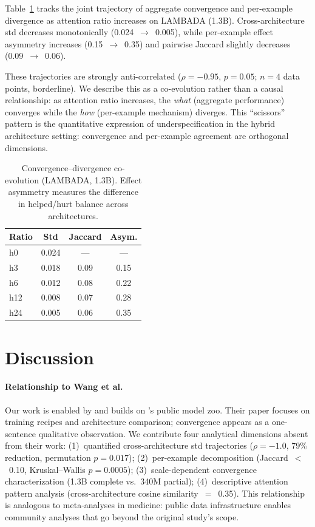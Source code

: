 \documentclass[11pt,twocolumn]{article}
\begin{document}
Table~\ref{tab:coevol} tracks the joint trajectory of aggregate convergence and per-example divergence as attention ratio increases on LAMBADA (1.3B).
Cross-architecture std decreases monotonically (0.024~$\to$~0.005), while per-example effect asymmetry increases (0.15~$\to$~0.35) and pairwise Jaccard slightly decreases (0.09~$\to$~0.06).

These trajectories are strongly anti-correlated ($\rho{=}{-}0.95$, $p{=}0.05$; $n{=}4$ data points, borderline).
We describe this as a co-evolution rather than a causal relationship: as attention ratio increases, the \emph{what} (aggregate performance) converges while the \emph{how} (per-example mechanism) diverges.
This ``scissors'' pattern is the quantitative expression of underspecification \citep{damour2022underspecification} in the hybrid architecture setting: convergence and per-example agreement are orthogonal dimensions.

\begin{table}[t]
\centering
\small
\caption{Convergence--divergence co-evolution (LAMBADA, 1.3B). Effect asymmetry measures the difference in helped/hurt balance across architectures.}\label{tab:coevol}
\begin{tabular}{@{}lccc@{}}
\toprule
\textbf{Ratio} & \textbf{Std} & \textbf{Jaccard} & \textbf{Asym.} \\
\midrule
h0 & 0.024 & --- & --- \\
h3 & 0.018 & 0.09 & 0.15 \\
h6 & 0.012 & 0.08 & 0.22 \\
h12 & 0.008 & 0.07 & 0.28 \\
h24 & 0.005 & 0.06 & 0.35 \\
\bottomrule
\end{tabular}
\end{table}


\section{Discussion}

\paragraph{Relationship to Wang et al.}
Our work is enabled by and builds on \citet{wang2025mamba}'s public model zoo.
Their paper focuses on training recipes and architecture comparison; convergence appears as a one-sentence qualitative observation.
We contribute four analytical dimensions absent from their work: (1)~quantified cross-architecture std trajectories ($\rho{=}{-}1.0$, 79\% reduction, permutation $p{=}0.017$); (2)~per-example decomposition (Jaccard~$<$~0.10, Kruskal--Wallis $p{=}0.0005$); (3)~scale-dependent convergence characterization (1.3B complete vs.\ 340M partial); (4)~descriptive attention pattern analysis (cross-architecture cosine similarity~$=$~0.35).
This relationship is analogous to meta-analyses in medicine: public data infrastructure enables community analyses that go beyond the original study's scope.
\end{document}
